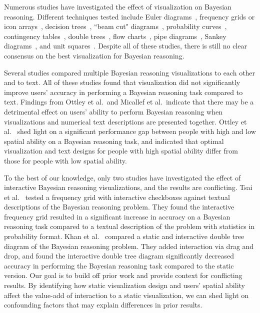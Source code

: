 Numerous studies have investigated the effect of visualization on Bayesian reasoning. Different techniques tested include Euler diagrams~\cite{brase2009Pictorial, kellenFacilitating2007, micallef2012Assessing, khan2015Benefits}, frequency grids or icon arrays~\cite{garcia2013Visual, kellenFacilitating2007, micallef2012Assessing, ottley2012Visually, sedlmeier2001Teaching, khan2015Benefits, tsai2011Interactive, bocherer2019How}, decision trees~\cite{friederichs2014Using, sedlmeier2001Teaching, spiegelhalter2011Visualizing, khan2015Benefits, bocherer2019How}, ``beam cut" diagrams~\cite{gigerenzer1995How}, probability curves~\cite{cole1989Understanding}, contingency tables~\cite{cole1989Understanding, cole1989Graphic}, double trees~\cite{khan2015Benefits, khan2018Interactive, bocherer2019How}, flow charts~\cite{khan2015Benefits}, pipe diagrams~\cite{khan2015Benefits}, Sankey diagrams~\cite{khan2015Benefits}, and unit squares~\cite{bocherer2019How}. Despite all of these studies, there is still no clear consensus on the best visualization for Bayesian reasoning. 

Several studies compared multiple Bayesian reasoning visualizations to each other and to text\cite{ottley2016Bayesian, micallef2012Assessing, khan2015Benefits}. All of these studies found that visualization did not significantly improve users' accuracy in performing a Bayesian reasoning task compared to text. Findings from Ottley et al.~and Micallef et al.~indicate that there may be a detrimental effect on users' ability to perform Bayesian reasoning when visualizations and numerical text descriptions are presented together\cite{ottley2016Bayesian, micallef2012Assessing}. Ottley et al.~\cite{ottley2016Bayesian} shed light on a significant performance gap between people with high and low spatial ability on a Bayesian reasoning task, and indicated that optimal visualization and text designs for people with high spatial ability differ from those for people with low spatial ability.

To the best of our knowledge, only two studies have investigated the effect of interactive Bayesian reasoning visualizations, and the results are conflicting. Tsai et al.~\cite{tsai2011Interactive} tested a frequency grid with interactive checkboxes against textual descriptions of the Bayesian reasoning problem. They found the interactive frequency grid resulted in a significant increase in accuracy on a Bayesian reasoning task compared to a textual description of the problem with statistics in probability format. Khan et al.~\cite{khan2018Interactive} compared a static and interactive double tree diagram of the Bayesian reasoning problem. They added interaction via drag and drop, and found the interactive double tree diagram significantly decreased accuracy in performing the Bayesian reasoning task compared to the static version. Our goal is to build off prior work and provide context for conflicting results. By identifying how static visualization design and users' spatial ability affect the value-add of interaction to a static visualization, we can shed light on confounding factors that may explain differences in prior results.
    
